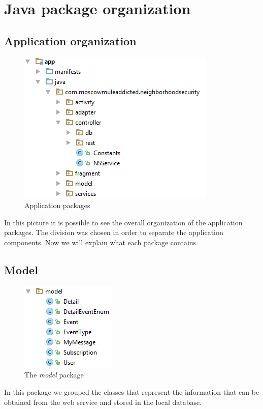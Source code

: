 \documentclass[a4paper]{scrreprt}
\begin{document}
\section{Java package organization}
\subsection{Application organization}
\begin{figure}[H]
	\centering
	\includegraphics{packages}
	\caption{Application packages}
\end{figure}

In this picture it is possible to see the overall organization of the application packages. The division was chosen in order to separate the application components. Now we will explain what each package contains.

\subsection{Model}
\begin{figure}[H]
	\centering
	\includegraphics{pack_model}
	\caption{The \emph{model} package}
\end{figure}
In this package we grouped the classes that represent the information that can be obtained from the web service and stored in the local database.
\end{document}
